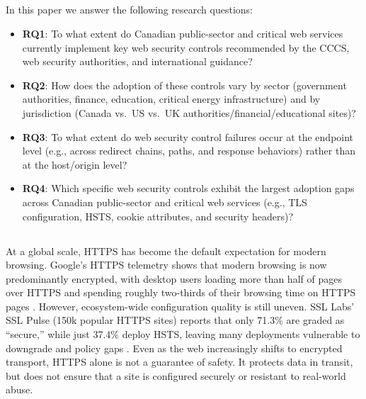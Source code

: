 \documentclass[pdflatex,sn-mathphys-num]{sn-jnl}
\numberwithin{equation}{section}
\theoremstyle{thmstyleone}
\theoremstyle{thmstyletwo}%
\theoremstyle{thmstylethree}%
\begin{document}
\subsection{\color{red}{Main Questions Posed}}

\vspace{1em}
In this paper we answer the following research questions:

\begin{itemize}
    \vspace{0.4em}
    \item \textbf{RQ1}: To what extent do Canadian public-sector and critical web services
    currently implement key web security controls recommended by the CCCS, web security authorities,
    and international guidance?

    \vspace{0.4em}
    \item \textbf{RQ2}: How does the adoption of these controls vary by sector (government authorities,
    finance, education, critical energy infrastructure) and by jurisdiction
    (Canada vs.\ US vs.\ UK authorities/financial/educational sites)?

    \item \textbf{RQ3}: To what extent do web security control failures occur at the endpoint level
    (e.g., across redirect chains, paths, and response behaviors) rather than at the host/origin level?

    \item \textbf{RQ4}: Which specific web security controls exhibit the largest adoption gaps across Canadian
    public-sector and critical web services (e.g., TLS configuration, HSTS, cookie attributes, and security headers)?

\end{itemize}

\subsection{\color{red}{Significant}}

\vspace{1em}
At a global scale, HTTPS has become the default expectation for modern browsing. Google’s HTTPS telemetry
shows that modern browsing is now predominantly encrypted, with desktop users loading more than half of pages
over HTTPS and spending roughly two-thirds of their browsing time on HTTPS pages \cite{GoogleTransparencyHTTPS}.
However, ecosystem-wide configuration quality is still uneven. SSL Labs’ SSL Pulse (150k popular HTTPS sites)
reports that only 71.3\% are graded as ``secure,'' while just 37.4\% deploy HSTS, leaving many deployments
vulnerable to downgrade and policy gaps \cite{SSLPulse}. Even as the web increasingly shifts to encrypted
transport, HTTPS alone is not a guarantee of safety. It protects data in transit, but does not ensure that a
site is configured securely or resistant to real-world abuse.
\end{document}
